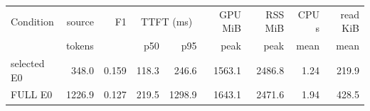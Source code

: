 \begin{tabular}{lrrrrrrrr}
\toprule
Condition & source & F1 & \multicolumn{2}{c}{TTFT (ms)} & GPU MiB & RSS MiB & CPU s & read KiB \\
 & tokens & & p50 & p95 & peak & peak & mean & mean \\
\midrule
selected E0 & 348.0 & 0.159 & 118.3 & 246.6 & 1563.1 & 2486.8 & 1.24 & 219.9 \\
FULL E0 & 1226.9 & 0.127 & 219.5 & 1298.9 & 1643.1 & 2471.6 & 1.94 & 428.5 \\
\bottomrule
\end{tabular}
